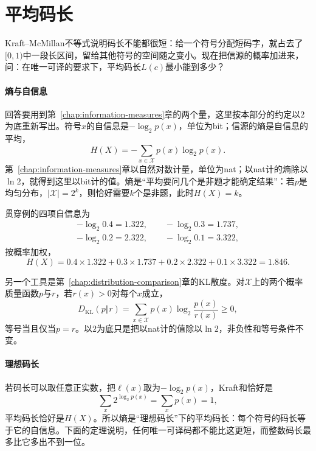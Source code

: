 \section{平均码长}
\label{sec:lossless-average-length}

Kraft–McMillan不等式说明码长不能都很短：给一个符号分配短码字，就占去了$[0,1)$中一段长区间，留给其他符号的空间随之变小。现在把信源的概率加进来，问：在唯一可译的要求下，平均码长$L(c)$最小能到多少？

\paragraph{熵与自信息}
回答要用到第~\ref{chap:information-measures}章的两个量，这里按本部分的约定以$2$为底重新写出。符号$x$的自信息是$-\log_2p(x)$，单位为bit；信源的熵是自信息的平均，
\begin{equation}
 H(X)=-\sum_{x\in\mathcal{X}}p(x)\log_2p(x).
 \label{eq:lossless-entropy}
\end{equation}
第~\ref{chap:information-measures}章以自然对数计量，单位为nat；以nat计的熵除以$\ln2$，就得到这里以bit计的值。熵是“平均要问几个是非题才能确定结果”：若$p$是均匀分布，$\lvert\mathcal{X}\rvert=2^k$，则恰好需要$k$个是非题，此时$H(X)=k$。

贯穿例的四项自信息为
\[
 \begin{gathered}
 -\log_2 0.4=1.322,\qquad -\log_2 0.3=1.737,\\
 -\log_2 0.2=2.322,\qquad -\log_2 0.1=3.322 ,
 \end{gathered}
\]
按概率加权，
\[
 H(X)=0.4\times1.322+0.3\times1.737+0.2\times2.322+0.1\times3.322=1.846 .
\]

另一个工具是第~\ref{chap:distribution-comparison}章的KL散度。对$\mathcal{X}$上的两个概率质量函数$p$与$r$，若$r(x)>0$对每个$x$成立，
\[
 D_{\mathrm{KL}}(p\Vert r)=\sum_{x\in\mathcal{X}}p(x)\log_2\frac{p(x)}{r(x)}\geq0 ,
\]
等号当且仅当$p=r$。以$2$为底只是把以nat计的值除以$\ln2$，非负性和等号条件不变。

\paragraph{理想码长}
若码长可以取任意正实数，把$\ell(x)$取为$-\log_2p(x)$，Kraft和恰好是
\[
 \sum_x2^{\log_2p(x)}=\sum_xp(x)=1 ,
\]
平均码长恰好是$H(X)$。所以熵是“理想码长”下的平均码长：每个符号的码长等于它的自信息。下面的定理说明，任何唯一可译码都不能比这更短，而整数码长最多比它多出不到一位。

